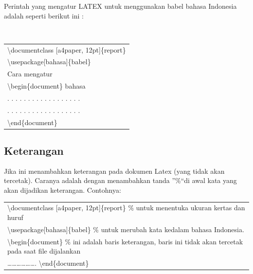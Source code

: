 \begin{raggedleft} Perintah yang mengatur LATEX untuk menggunakan babel bahasa Indonesia adalah seperti berikut ini :\end{raggedleft} \\
\begin{tabular}{|p{13.5cm}|}
\hline
\textbackslash documentclass [a4paper, 12pt]\{report\}\\
\textbackslash usepackage[bahasa]\{babel\}\\
Cara mengatur\\
\textbackslash begin\{document\} bahasa\\
. . . . . . . . . . . . . . . . . .\\
. . . . . . . . . . . . . . . . . .\\
\textbackslash end\{document\}\\
\hline
\end{tabular}
\subsection{Keterangan}
Jika ini menambahkan keterangan pada dokumen Latex (yang tidak akan tercetak). Caranya adalah dengan menambahkan  tanda \textquotedblright \%\textquotedblleft  di awal kata yang akan dijadikan keterangan. Contohnya:\\[0.5 cm]
\begin{tabular}{|p{13.5cm}|}
\hline
 \textbackslash documentclass [a4paper, 12pt]\{report\} \% untuk menentuka ukuran kertas dan huruf\\
\textbackslash  usepackage[bahasa]\{babel\} \% untuk merubah kata kedalam bahasa Indonesia.\\
\textbackslash  begin\{document\}
   \% ini adalah baris keterangan, baris ini tidak akan tercetak pada saat file dijalankan\\
  ……………….
\textbackslash end\{document\}\\

\hline
\end{tabular}
